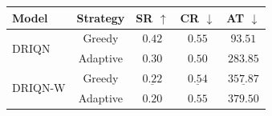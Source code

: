 \begin{table}
\centering
\small
\begin{tabular*}{\columnwidth}{@{\extracolsep{\fill}}lcccc@{}}
\toprule
Model & Strategy & SR $\uparrow$ & CR $\downarrow$ & AT $\downarrow$ \\
\midrule
\multirow{2}{*}{DRIQN}
 & Greedy   & $\mathbf{0.42}$ & $0.55$ & $\mathbf{93.51}$ \\
 & Adaptive & $0.30$ & $\mathbf{0.50}$ & $283.85$ \\
\midrule
\multirow{2}{*}{DRIQN-W}
 & Greedy   & $\underline{0.22}$ & $\underline{0.54}$ & $\underline{357.87}$ \\
 & Adaptive & $0.20$ & $0.55$ & $379.50$ \\
\bottomrule
\end{tabular*}


\end{table}